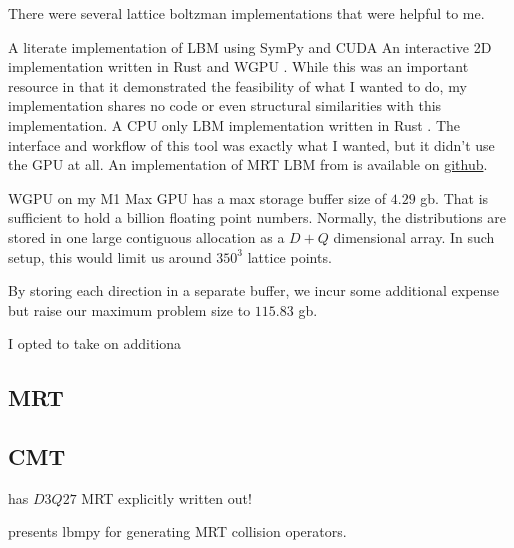 There were several lattice boltzman implementations that were helpful to me.
\begin{outline}
  \1 A literate implementation of LBM using SymPy and CUDA \cite{web:literate_lbm}
  \1 An interactive 2D implementation written in Rust and WGPU \cite{web:lbm-web}.
  \2 While this was an important resource in that it demonstrated 
  the feasibility of what I wanted to do, 
  my implementation shares no code or even structural similarities 
  with this implementation.
  \1 A CPU only LBM implementation written in Rust \cite{web:lbm-rs}.
  \2 The interface and workflow of this tool was exactly what I wanted, but it didn't use the GPU at all.
  \1 An implementation of MRT LBM from \cite{Yang2022} is available on \href{https://github.com/yjhp1016/taichi_LBM3D/}{github}.
\end{outline}

WGPU on my M1 Max GPU has a max storage buffer size of $4.29$ gb.
That is sufficient to hold a billion floating point numbers.
Normally, the distributions are stored in one large contiguous allocation 
as a $D+Q$ dimensional array.
In such setup, this would limit us around $350^3$ lattice points.

By storing each direction in a separate buffer, we incur some additional expense but raise our maximum problem size to $115.83$ gb.

I opted to take on additiona

\subsection{MRT}

\subsection{CMT}


\cite{Suga2015} has $D3Q27$ MRT explicitly written out!

\cite{Hennig2023} presents lbmpy for generating MRT collision operators.
